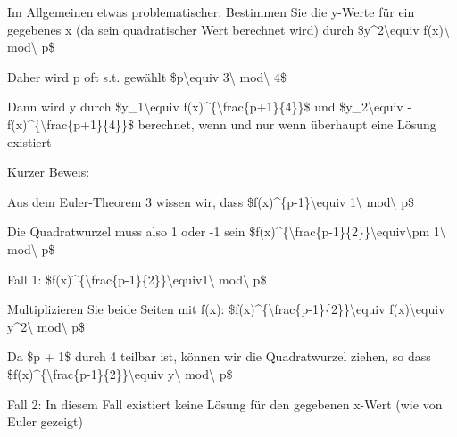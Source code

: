 \documentclass[a4paper]{article}
\begin{document}
\begin{multicols}{3}
      \begin{itemize*}
            \item
            Im Allgemeinen etwas problematischer: Bestimmen Sie die y-Werte für
            ein gegebenes x (da sein quadratischer Wert berechnet wird) durch
            \$y\^{}2\textbackslash equiv f(x)\textbackslash{} mod\textbackslash{}
            p\$
            \item
            Daher wird p oft s.t. gewählt \$p\textbackslash equiv
            3\textbackslash{} mod\textbackslash{} 4\$
            \item
            Dann wird y durch \$y\_1\textbackslash equiv
            f(x)\^{}\{\textbackslash frac\{p+1\}\{4\}\}\$ und
            \$y\_2\textbackslash equiv
            -f(x)\^{}\{\textbackslash frac\{p+1\}\{4\}\}\$ berechnet, wenn und nur
            wenn überhaupt eine Lösung existiert
            \item
            Kurzer Beweis:

            \begin{itemize*}
                  \item Aus dem Euler-Theorem 3 wissen wir, dass \$f(x)\^{}\{p-1\}\textbackslash equiv 1\textbackslash{} mod\textbackslash{} p\$
                  \item Die Quadratwurzel muss also 1 oder -1 sein \$f(x)\^{}\{\textbackslash frac\{p-1\}\{2\}\}\textbackslash equiv\textbackslash pm 1\textbackslash{} mod\textbackslash{} p\$
            \end{itemize*}
            \item
            Fall 1:
            \$f(x)\^{}\{\textbackslash frac\{p-1\}\{2\}\}\textbackslash equiv1\textbackslash{}
            mod\textbackslash{} p\$

            \begin{itemize*}
                  \item Multiplizieren Sie beide Seiten mit f(x): \$f(x)\^{}\{\textbackslash frac\{p-1\}\{2\}\}\textbackslash equiv f(x)\textbackslash equiv y\^{}2\textbackslash{} mod\textbackslash{} p\$
                  \item Da \$p + 1\$ durch 4 teilbar ist, können wir die Quadratwurzel ziehen, so dass \$f(x)\^{}\{\textbackslash frac\{p-1\}\{2\}\}\textbackslash equiv y\textbackslash{} mod\textbackslash{} p\$
            \end{itemize*}
            \item
            Fall 2: In diesem Fall existiert keine Lösung für den gegebenen x-Wert
            (wie von Euler gezeigt)
      \end{itemize*}



\end{multicols}
\end{document}
